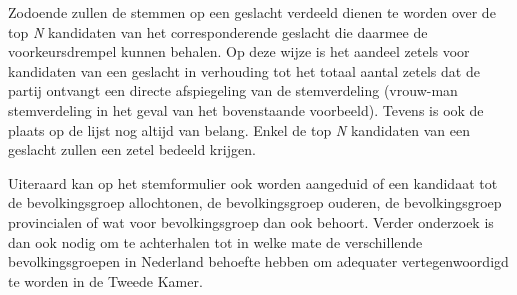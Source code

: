 Zodoende zullen de stemmen op een geslacht verdeeld dienen te worden over de top \textit{N} kandidaten van het corresponderende geslacht die daarmee de voorkeursdrempel kunnen behalen. Op deze wijze is het aandeel zetels voor kandidaten van een geslacht in verhouding tot het totaal aantal zetels dat de partij ontvangt een directe afspiegeling van de stemverdeling (vrouw-man stemverdeling in het geval van het bovenstaande voorbeeld). Tevens is ook de plaats op de lijst nog altijd van belang. Enkel de top \textit{N} kandidaten van een geslacht zullen een zetel bedeeld krijgen. 

Uiteraard kan op het stemformulier ook worden aangeduid of een kandidaat tot de bevolkingsgroep allochtonen, de bevolkingsgroep ouderen, de bevolkingsgroep provincialen of wat voor bevolkingsgroep dan ook behoort. Verder onderzoek is dan ook nodig om te achterhalen tot in welke mate de verschillende bevolkingsgroepen in Nederland behoefte hebben om adequater vertegenwoordigd te worden in de Tweede Kamer. 


